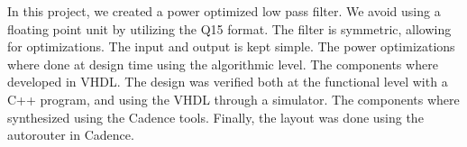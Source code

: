 

In this project, we created a power optimized low pass filter.  We avoid using a floating point unit by utilizing the Q15 format.  The filter is symmetric, allowing for optimizations.  The input and output is kept simple.    The power optimizations where done at design time using the algorithmic level.  The components where developed in VHDL.  The design was verified both at the functional level with a C++ program, and using the VHDL through a simulator.  The components where synthesized using the Cadence tools.  Finally, the layout was done using the autorouter in Cadence.

